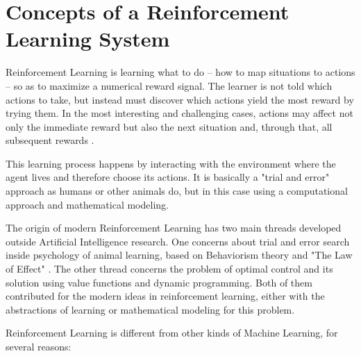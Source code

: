 \section{Concepts of a Reinforcement Learning System} \label{sec:rlconcepts}

Reinforcement Learning is learning what to do -- how to map situations to actions -- so as to maximize
a numerical reward signal. The learner is not told which actions to take, but instead must discover
which actions yield the most reward by trying them. In the most interesting and challenging cases,
actions may affect not only the immediate reward but also the next situation and, through that, all
subsequent rewards \cite{sutton1998rli}.

This learning process happens by interacting with the environment where the agent lives and therefore choose its actions. It is basically a "trial and error" approach as humans or other animals do, but in this case using a computational approach and mathematical modeling.

The origin of modern Reinforcement Learning has two main threads developed outside Artificial Intelligence research. One concerns about trial and error search inside psychology of animal learning, based on Behaviorism theory \cite{skinner1953science} and "The Law of Effect" \cite{Thorndike173}. The other thread concerns the problem of optimal control and its solution using value functions
and dynamic programming. Both of them contributed for the modern ideas in reinforcement learning, either with the abstractions of learning or mathematical modeling for this problem.

Reinforcement Learning is different from other kinds of Machine Learning, for several reasons:

